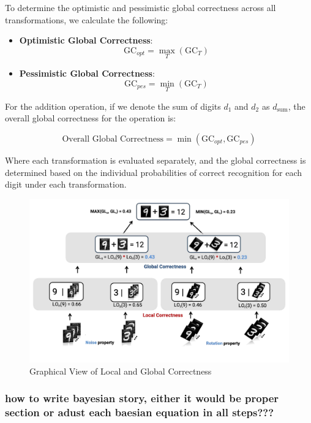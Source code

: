 \documentclass[10pt, conference, a4paper, final]{IEEEtran}
\begin{document}
    To determine the optimistic and pessimistic global correctness across all transformations, we calculate the following:
    
    \begin{itemize}
        \item \textbf{Optimistic Global Correctness}:
        \[
        \text{GC}_{opt} = \max_{T} (\text{GC}_{T})
        \]
        \item \textbf{Pessimistic Global Correctness}:
        \[
        \text{GC}_{pes} = \min_{T} (\text{GC}_{T})
        \]
    \end{itemize}
    
    For the addition operation, if we denote the sum of digits \( d_1 \) and \( d_2 \) as \( d_{\text{sum}} \), the overall global correctness for the operation is:
    
    \[
    \text{Overall Global Correctness} = \min(\text{GC}_{opt}, \text{GC}_{pes})
    \]
    
    Where each transformation is evaluated separately, and the global correctness is determined based on the individual probabilities of correct recognition for each digit under each transformation.
    \begin{figure}{}
        \centering
        \includegraphics[width=\linewidth]{paper_images/noise_rotation_localcal_global.pdf}
        \caption{Graphical View of Local and Global Correctness}
        \label{fig:graph}
    \end{figure}

 
\subsubsection{how to write bayesian story, either it would be proper section or adust each baesian equation in all steps??? }
\end{document}
